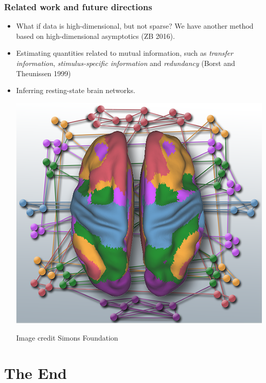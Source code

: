 \documentclass{beamer}
\begin{document}
\begin{frame}
\frametitle{Related work and future directions}
\begin{itemize}
\item What if data is high-dimensional, but not sparse?  We have another method based on high-dimensional asymptotics (ZB 2016).\pause
\item Estimating quantities related to mutual information, such as \emph{transfer information}, \emph{stimulus-specific information} and \emph{redundancy} (Borst and Theunissen 1999) \pause
\item Inferring resting-state brain networks.
\begin{center}
\includegraphics[scale = 0.5]{cmsIMG_6589b1.png}
\end{center}
{\tiny Image credit Simons Foundation}
\end{itemize}
\end{frame}

\section{The End}

\begin{frame}
\sectionpage
\end{frame}
\end{document}
